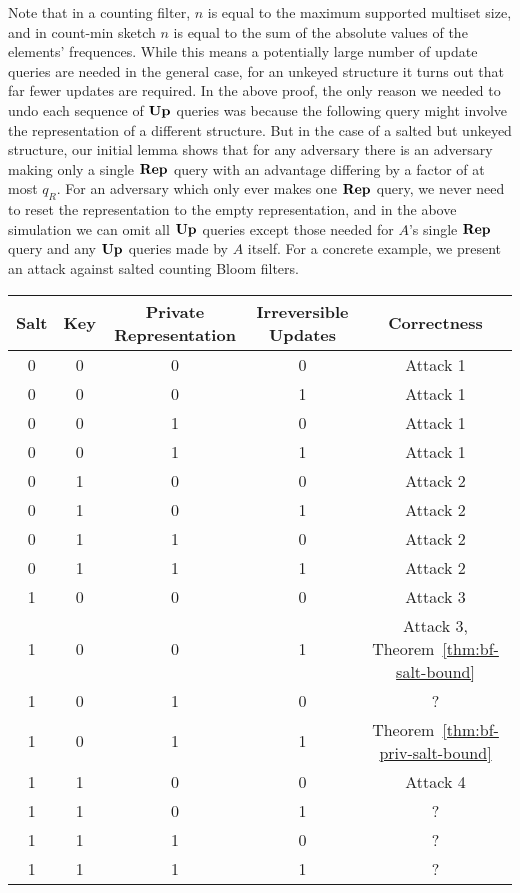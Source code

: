 Note that in a counting filter, $n$ is equal to the maximum supported multiset size, and in count-min sketch $n$ is equal to the sum of the absolute values of the elements' frequences. While this means a potentially large number of update queries are needed in the general case, for an unkeyed structure it turns out that far fewer updates are required. In the above proof, the only reason we needed to undo each sequence of $\mathbf{Up}\hspace{0.5pt}$ queries was because the following query might involve the representation of a different structure. But in the case of a salted but unkeyed structure, our initial lemma shows that for any adversary there is an adversary making only a single $\mathbf{Rep}\hspace{0.5pt}$ query with an advantage differing by a factor of at most $q_R$. For an adversary which only ever makes one $\mathbf{Rep}\hspace{0.5pt}$ query, we never need to reset the representation to the empty representation, and in the above simulation we can omit all $\mathbf{Up}\hspace{0.5pt}$ queries except those needed for $A$'s single $\mathbf{Rep}\hspace{0.5pt}$ query and any $\mathbf{Up}\hspace{0.5pt}$ queries made by $A$ itself. For a concrete example, we present an attack against salted counting Bloom filters.

\begin{center}
  \begin{tabular}{ | c | c | c | c | c | }
    \hline
    Salt & Key & Private Representation & Irreversible Updates & Correctness \\ \hline
    0 & 0 & 0 & 0 & Attack 1 \\ \hline
    0 & 0 & 0 & 1 & Attack 1 \\ \hline
    0 & 0 & 1 & 0 & Attack 1 \\ \hline
    0 & 0 & 1 & 1 & Attack 1 \\ \hline
    0 & 1 & 0 & 0 & Attack 2 \\ \hline
    0 & 1 & 0 & 1 & Attack 2 \\ \hline
    0 & 1 & 1 & 0 & Attack 2 \\ \hline
    0 & 1 & 1 & 1 & Attack 2 \\ \hline
    1 & 0 & 0 & 0 & Attack 3 \\ \hline
    1 & 0 & 0 & 1 & Attack 3, Theorem~\ref{thm:bf-salt-bound} \\ \hline
    1 & 0 & 1 & 0 & ? \\ \hline
    1 & 0 & 1 & 1 & Theorem~\ref{thm:bf-priv-salt-bound} \\ \hline
    1 & 1 & 0 & 0 & Attack 4 \\ \hline
    1 & 1 & 0 & 1 & ? \\ \hline
    1 & 1 & 1 & 0 & ? \\ \hline
    1 & 1 & 1 & 1 & ? \\
    \hline
  \end{tabular}
\end{center}

